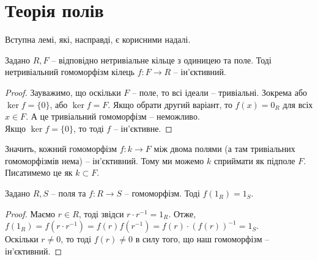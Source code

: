 \documentclass{math_library}
\begin{document}
\fi

\section{Теорія полів}
Вступна лемі, які, насправді, є корисними надалі.

\begin{lemma}
Задано $R,F$ -- відповідно нетривіальне кільце з одиницею та поле. Тоді нетривіальний гомоморфізм кілець $f \colon F \to R$ -- ін'єктивний.
\end{lemma}

\begin{proof}
Зауважимо, що оскільки $F$ -- поле, то всі ідеали -- тривіальні. Зокрема або $\ker f = \{0\}$, або $\ker f = F$. Якщо обрати другий варіант, то $f(x) = 0_R$ для всіх $x \in F$. А це тривіальний гомоморфізм -- неможливо.\\
Якщо $\ker f = \{0\}$, то тоді $f$ -- ін'єктивне.
\end{proof}

Значить, кожний гомоморфізм $f \colon k \to F$ між двома полями (а там тривіальних гомоморфізмів нема) -- ін'єктивний. Тому ми можемо $k$ сприймати як підполе $F$. Писатимемо це як $k \subset F$.

\begin{lemma}
Задано $R,S$ -- поля та $f \colon R \to S$ -- гомоморфізм. Тоді $f(1_R) = 1_S$.
\end{lemma}

\begin{proof}
Маємо $r \in R$, тоді звідси $r \cdot r^{-1} = 1_R$. Отже,\\
$f(1_R) = f(r \cdot r^{-1}) = f(r) f(r^{-1}) = f(r) \cdot (f(r))^{-1} = 1_S$.\\
Оскільки $r \neq 0$, то тоді $f(r) \neq 0$ в силу того, що наш гомоморфізм -- ін'єктивний.
\end{proof}

\newpage
\end{document}
